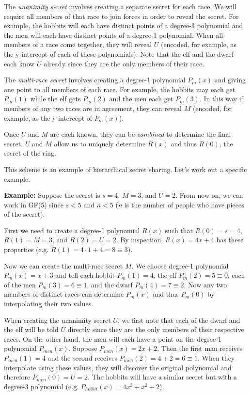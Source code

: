 \documentclass[]{article}
\begin{document}
\begin{qunlist}
{{The \textit{unanimity secret} involves creating a separate secret for each race. We will require all members of that race to join forces in order to reveal the secret. For example, the hobbits will each have distinct points of a degree-3 polynomial and the men will each have distinct points of a degree-1 polynomial. When all members of a race come together, they will reveal $U$ (encoded, for example, as the y-intercept of each of these polynomials). Note that the elf and the dwarf each know $U$ already since they are the only members of their race.

The \textit{multi-race secret} involves creating a degree-1 polynomial $P_m(x)$ and giving one point to all members of each race. For example, the hobbits may each get $P_m(1)$ while the elf gets $P_m(2)$ and the men each get $P_m(3)$. In this way if members of any two races are in agreement, they can reveal $M$ (encoded, for example, as the y-intercept of $P_m(x)$).

Once $U$ and $M$ are each known, they can be \textit{combined} to determine the final secret. $U$ and $M$ allow us to uniquely determine $R(x)$ and thus $R(0)$, the secret of the ring.

This scheme is an example of hierarchical secret sharing. Let's work out a specific example.

\textbf{Example:} Suppose the secret is $s=4$, $M=3$, and $U=2$. From now on, we can work in GF(5) since $s<5$ and $n<5$ ($n$ is the number of people who have pieces of the secret).

First we need to create a degree-1 polynomial $R(x)$ such that $R(0)=s=4$, $R(1)=M=3$, and $R(2)=U=2$. By inspection, $R(x) = 4x + 4$ has these properties (e.g. $R(1) = 4\cdot1 + 4 = 8 \equiv 3$).

Now we can create the multi-race secret $M$. We choose degree-1 polynomial $P_m(x) = x+3$ and tell each hobbit $P_m(1)=4$, the elf $P_m(2)=5\equiv0$, each of the men $P_m(3)=6 \equiv 1$, and the dwarf $P_m(4) = 7 \equiv 2$. Now any two members of distinct races can determine $P_m(x)$ and thus $P_m(0)$ by interpolating their two values.

When creating the unanimity secret $U$, we first note that each of the dwarf and the elf will be told $U$ directly since they are the only members of their respective races. On the other hand, the men will each have a point on the degree-1 polynomial $P_{men}(x)$. Suppose $P_{men}(x) = 2x+2$. Then the first man receives $P_{men}(1) = 4$ and the second receives $P_{men}(2) = 4+2 = 6 \equiv 1$. When they interpolate using these values, they will discover the original polynomial and therefore $P_{men}(0) = U = 2$. The hobbits will have a similar secret but with a degree-3 polynomial (e.g. $P_{hobbit}(x) = 4x^3 + x^2 + 2$).

}}
\end{qunlist}
\end{document}
